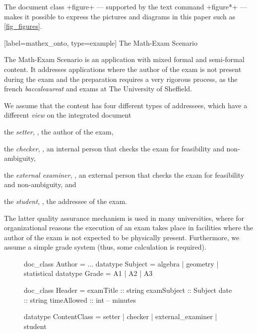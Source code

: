 \begin{isabellebody}
%
\begin{isamarkuptext}%
The document class \inlineisar+figure+ --- supported by the \isadof text command 
\inlineisar+figure*+ --- makes it possible to express the pictures and diagrams in this paper 
such as \autoref{fig_figures}.%
\end{isamarkuptext}\isamarkuptrue%
%
\isaDofSubsectionExample%
%
[label={mathex_onto}, type={example}]%
{The Math-Exam Scenario}%
%
\begin{isamarkuptext}%
The Math-Exam Scenario is an application with mixed formal and 
semi-formal content. It addresses applications where the author of the exam is not present 
during the exam and the preparation requires a very rigorous process, as the french 
\emph{baccaleaureat} and exams at The University of Sheffield.

We assume that the content has four different types of addressees, which have a different
\emph{view} on the integrated document 
\begin{compactitem}
\item the \emph{setter}, \ie, the author of the exam, 
\item the \emph{checker}, \ie, an internal person that checks the exam for feasibility 
and non-ambiguity, 
\item the \emph{external examiner}, \ie, an external person that checks the exam for 
feasibility and non-ambiguity, and 
\item the \emph{student}, \ie, the addressee of the exam. 
\end{compactitem}
The latter quality assurance mechanism is used in many universities,
where for organizational reasons the execution of an exam takes place in facilities
where the author of the exam is not expected to be physically present.
Furthermore, we assume a simple grade system (thus, some calculation is required). 

\begin{figure}
\begin{isar}
doc_class Author = ...
datatype Subject =  algebra | geometry | statistical
datatype Grade =  A1 | A2 | A3

doc_class Header =  examTitle   :: string
                    examSubject :: Subject
                    date        :: string
                    timeAllowed :: int --  minutes

datatype ContentClass =  setter
                      | checker 
                      | external_examiner   
                      | student   


\end{isar}
\end{figure}
\end{isamarkuptext}
\end{isabellebody}
